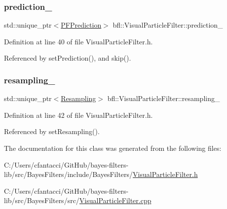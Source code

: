 \subsubsection{\texorpdfstring{prediction\+\_\+}{prediction\_}}
{\footnotesize\ttfamily std\+::unique\+\_\+ptr$<$\mbox{\hyperlink{classbfl_1_1PFPrediction}{P\+F\+Prediction}}$>$ bfl\+::\+Visual\+Particle\+Filter\+::prediction\+\_\+\hspace{0.3cm}{\ttfamily [protected]}}



Definition at line 40 of file Visual\+Particle\+Filter.\+h.



Referenced by set\+Prediction(), and skip().

\mbox{\label{classbfl_1_1VisualParticleFilter_aa0b7a55de5ccd0ffb6ebdf765bf73e07}} 
\subsubsection{\texorpdfstring{resampling\+\_\+}{resampling\_}}
{\footnotesize\ttfamily std\+::unique\+\_\+ptr$<$\mbox{\hyperlink{classbfl_1_1Resampling}{Resampling}}$>$ bfl\+::\+Visual\+Particle\+Filter\+::resampling\+\_\+\hspace{0.3cm}{\ttfamily [protected]}}



Definition at line 42 of file Visual\+Particle\+Filter.\+h.



Referenced by set\+Resampling().



The documentation for this class was generated from the following files\+:\begin{DoxyCompactItemize}
\item 
C\+:/\+Users/cfantacci/\+Git\+Hub/bayes-\/filters-\/lib/src/\+Bayes\+Filters/include/\+Bayes\+Filters/\mbox{\hyperlink{VisualParticleFilter_8h}{Visual\+Particle\+Filter.\+h}}\item 
C\+:/\+Users/cfantacci/\+Git\+Hub/bayes-\/filters-\/lib/src/\+Bayes\+Filters/src/\mbox{\hyperlink{VisualParticleFilter_8cpp}{Visual\+Particle\+Filter.\+cpp}}\end{DoxyCompactItemize}
